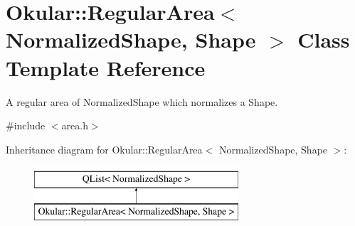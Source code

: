 \hypertarget{classOkular_1_1RegularArea}{\section{Okular\+:\+:Regular\+Area$<$ Normalized\+Shape, Shape $>$ Class Template Reference}
\label{classOkular_1_1RegularArea}
}


A regular area of Normalized\+Shape which normalizes a Shape.  




{\ttfamily \#include $<$area.\+h$>$}

Inheritance diagram for Okular\+:\+:Regular\+Area$<$ Normalized\+Shape, Shape $>$\+:\begin{figure}[H]
\begin{center}
\leavevmode
\includegraphics[height=2.000000cm]{classOkular_1_1RegularArea}
\end{center}
\end{figure}

